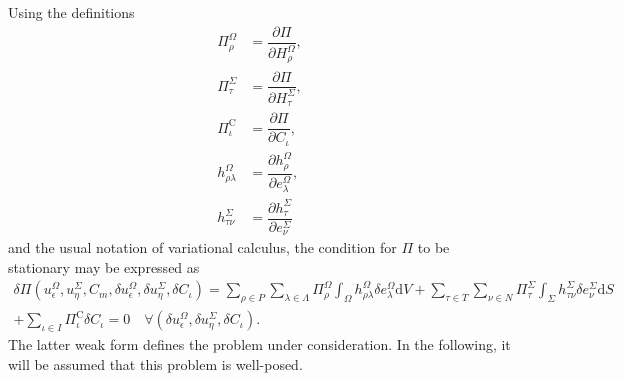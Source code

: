 \documentclass[pdftex,a4paper,12pt,abstracton]{scrartcl}
\begin{document}
Using the definitions
\begin{equation}
\begin{split}
\Pi^\Omega_\rho      &= \dfrac{\partial \Pi}{\partial H^\Omega_\rho},\\
\Pi^\Sigma_\tau      &= \dfrac{\partial \Pi}{\partial H^\Sigma_\tau},\\
\Pi^\mathrm{C}_\iota &= \dfrac{\partial \Pi}{\partial C_\iota},\\
h^\Omega_{\rho \lambda}     &= \dfrac{\partial h^\Omega_\rho}{\partial e^\Omega_\lambda},\\
h^\Sigma_{\tau \nu}  &= \dfrac{\partial h^\Sigma_\tau}{\partial e^\Sigma_\nu}
\end{split}
\end{equation}
and the usual notation of variational calculus, the condition for $\Pi$ to be stationary may be expressed as
\begin{multline}
  \delta \Pi(u^\Omega_\epsilon, u^\Sigma_\eta, C_m, \delta u^\Omega_\epsilon, \delta u^\Sigma_\eta, \delta C_\iota)
  =
    \sum_{\rho \in P} \sum_{\lambda \in \Lambda} \Pi^\Omega_\rho \int_\Omega h^\Omega_{\rho \lambda} \delta e^\Omega_\lambda \mathrm{d}V
  + \sum_{\tau \in T} \sum_{\nu \in N} \Pi^\Sigma_\tau \int_\Sigma h^\Sigma_{\tau\nu} \delta e^\Sigma_\nu \mathrm{d}S\\
  + \sum_{\iota \in I} \Pi^\mathrm{C}_\iota \delta C_\iota
  = 0
  \quad \forall (\delta u^\Omega_\epsilon, \delta u^\Sigma_\eta, \delta C_\iota).
  \label{stationarity_conditions}
\end{multline}
The latter weak form defines the problem under consideration. In the following, it will be assumed that this problem is well-posed.
\end{document}
